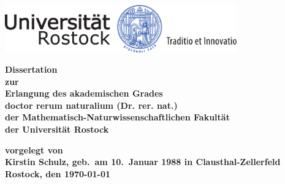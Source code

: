 
\thispagestyle{empty}
\begin{center}
\vspace*{-2cm}
\includegraphics[width=0.75\textwidth]{unilogo-siegel-farbe}\\
\vspace*{3cm}
    {\titlefont \huge \onehalfspacing
	\thetitle 
    \par}%
   \vfill
    {\normalfont\normalcolor\bfseries
	\large
	Dissertation \\
	\large
	zur\\
	Erlangung des akademischen Grades\\
	doctor rerum naturalium (Dr. rer. nat.)\\ 
	der Mathematisch-Naturwissenschaftlichen Fakultät\\
	der Universität Rostock
    \par}%
\end{center}\par
\vspace*{2.5cm}
\noindent\begin{minipage}[b]{\textwidth}
{\bf
  \noindent vorgelegt von\\
  Kirstin Schulz, geb.~am 10.~Januar 1988 in 
Clausthal-Zellerfeld\\



  \noindent Rostock, den  \today
  }
\end{minipage}


